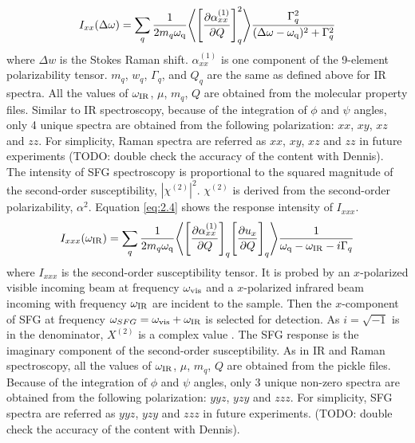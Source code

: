 \begin{equation} \label{eq:2.3}
I_{xx}(\Delta \omega) = \sum_{q} \frac{1}{2 m_{q} \omega_{\rm q}} \Bigg \langle \Bigg\lbrack \frac{\partial \alpha_{xx}^{(1)}}{\partial Q} \Bigg\rbrack_{q} ^2 \Bigg\rangle \frac{\Gamma_q^2}{(\Delta \omega-\omega_{\rm q})^2 + \Gamma_q^2}
\end{equation} 
where $\Delta w$ is the Stokes Raman shift. $\alpha_{xx}^{(1)}$ is one component of the 9-element polarizability tensor. $m_q$, $w_q$, $\Gamma_q$, and $Q_q$ are the same as defined above for IR spectra. All the values of $\omega_{\rm IR}$, $\mu$, $m_q$, $Q$ are obtained from the molecular property files. Similar to IR spectroscopy, because of the integration of $\phi$ and $\psi$ angles, only 4 unique spectra are obtained from the following polarization: $xx$, $xy$, $xz$ and $zz$. For simplicity, Raman spectra are referred as $xx$, $xy$, $xz$ and $zz$ in future experiments (TODO: double check the accuracy of the content with Dennis). \\

The intensity of SFG spectroscopy is proportional to the squared magnitude of the second-order susceptibility, $\left|\chi^{(2)}\right|^{2}$. $\chi^{(2)}$ is derived from the second-order polarizability, $\alpha^{2}$. Equation \ref{eq:2.4} shows the response intensity of $I_{xxx}$. \\
\begin{equation} \label{eq:2.4}
I_{xxx}(\omega_{\rm IR}) = \sum_{q} \frac{1}{2 m_{q} \omega_{\rm q}} \Bigg \langle \Bigg\lbrack \frac{\partial \alpha_{xx}^{(1)}}{\partial Q} \Bigg\rbrack_{q} \Bigg\lbrack \frac{\partial u_{x}}{\partial Q} \Bigg\rbrack_{q} \Bigg\rangle \frac{1}{\omega_{\rm q}-\omega_{\rm IR}-i\Gamma_q}
\end{equation} 
where $I_{xxx}$ is the second-order susceptibility tensor. It is probed by an $x$-polarized visible incoming beam at frequency $\omega_{\rm vis}$ and a $x$-polarized infrared beam incoming with frequency $\omega_{\rm IR}$ are incident to the sample. Then the $x$-component of SFG at frequency $\omega_{SFG}=\omega_{\rm vis}+\omega_{\rm IR}$ is selected for detection. As $i=\sqrt{-1}$ is in the denominator, $X^{(2)}$ is a complex value \cite{KuoKaiHung:Thesis:2015}. The SFG response is the imaginary component of the second-order susceptibility. As in IR and Raman spectroscopy, all the values of $\omega_{\rm IR}$, $\mu$, $m_q$, $Q$ are obtained from the pickle files. Because of the integration of $\phi$ and $\psi$ angles, only 3 unique non-zero spectra are obtained from the following polarization: $yyz$, $yzy$ and $zzz$. For simplicity, SFG spectra are referred as $yyz$, $yzy$ and $zzz$ in future experiments.  (TODO: double check the accuracy of the content with Dennis). \\

